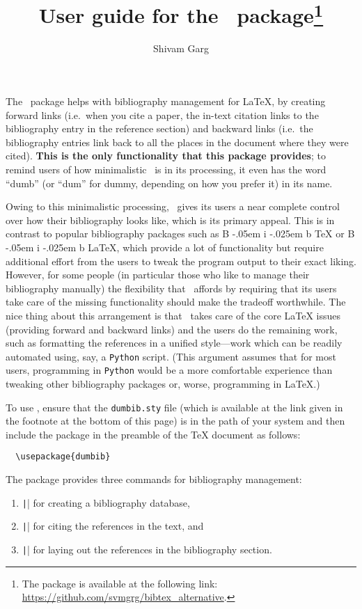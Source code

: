 \documentclass[letter, 11pt]{article}
\title{User guide for the \dumbib\ package\footnote{The package is available at the following link: \url{https://github.com/svmgrg/bibtex_alternative}.}}
\author{Shivam Garg}
\def\Bib{%
  {%
    \rm
    B%
    \kern-.05em%
    {%
      \sc
      i%
      \kern-.025em %
      b%
    }%
  }%
}
\begin{document}
\maketitle

The \dumbib\ package helps with bibliography management for \LaTeX{}, by creating forward links (i.e.\ when you cite a paper, the in-text citation links to the bibliography entry in the reference section) and backward links (i.e.\ the bibliography entries link back to all the places in the document where they were cited). \textbf{This is the only functionality that this package provides}; to remind users of how minimalistic \dumbib\ is in its processing, it even has the word ``dumb'' (or ``dum'' for dummy, depending on how you prefer it) in its name.

Owing to this minimalistic processing, \dumbib\ gives its users a near complete control over how their bibliography looks like, which is its primary appeal. This is in contrast to popular bibliography packages such as \Bib\TeX{} or \Bib\LaTeX, which provide a lot of functionality but require additional effort from the users to tweak the program output to their exact liking. However, for some people (in particular those who like to manage their bibliography manually) the flexibility that \dumbib\ affords by requiring that its users take care of the missing functionality should make the tradeoff worthwhile. The nice thing about this arrangement is that \dumbib\ takes care of the core \LaTeX{} issues (providing forward and backward links) and the users do the remaining work, such as formatting the references in a unified style---work which can be readily automated using, say, a \texttt{Python} script. (This argument assumes that for most users, programming in \texttt{Python} would be a more comfortable experience than tweaking other bibliography packages or, worse, programming in \LaTeX.)

To use \dumbib, ensure that the \texttt{dumbib.sty} file (which is available at the link given in the footnote at the bottom of this page) is in the path of your system and then include the package in the preamble of the \TeX{} document as follows:
\begin{verbatim}
  \usepackage{dumbib}
\end{verbatim}
The package provides three commands for bibliography management:
\begin{enumerate}
\item \texttt|\dumbibReferenceEntry{}| for creating a bibliography database,
\item \texttt|\cite{}| for citing the references in the text, and
\item \texttt|\dumbibCreateBibliography| for laying out the references in the bibliography section.
\end{enumerate}
\end{document}
